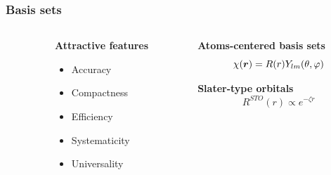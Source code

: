 \begin{frame}
    \frametitle{Basis sets}
    \begin{columns}
    \begin{column}{.10\textwidth}
    \end{column}
    \begin{column}{.30\textwidth}
    \textbf{Attractive features}
    \begin{itemize}
        \item {\color{green} Accuracy}
        \item {\color{green} Compactness}
        \item {\color{red} Efficiency}
        \item {\color{yellow} Systematicity}
        \item {\color{red} Universality}
    \end{itemize}
    \end{column}
    \begin{column}{.60\textwidth}
    \centering
    \textbf{Atoms-centered basis sets}
    \begin{equation}
        \nonumber
        \chi(\boldsymbol r) = R(r)Y_{lm}(\theta,\varphi)
    \end{equation}
    
    \vspace{5mm}

    \textbf{Slater-type orbitals}
    \begin{equation}
        \nonumber
        R^{STO}(r) \propto e^{-\zeta r}
    \end{equation}
    \end{column}
    \end{columns}    

    \vspace{5mm}


\end{frame}
